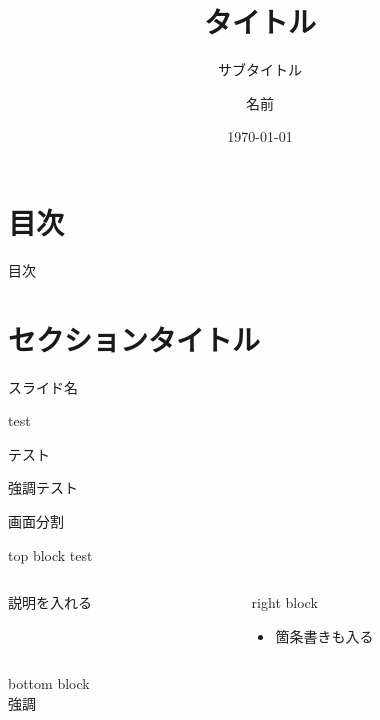 \documentclass[12pt,xcolor=dvipsnames,table,dvipdfmx, aspectratio=169]{beamer} %
\title{タイトル}
\subtitle{サブタイトル}
\author[name]{名前}
\institute[workplace]{所属}
\date{\today}
\theoremstyle{definition}
\begin{document}
	\begin{frame}[plain] %
		\titlepage
	\end{frame}


 	\section*{目次} %
 	\begin{frame}{目次}
 	\tableofcontents
	 \end{frame}

\section{セクションタイトル}

\begin{frame}{\insertsection}{スライド名}
	\begin{block}{test}
	\end{block}
	
	\begin{exampleblock}{テスト}
	\end{exampleblock}
	
	\begin{alertblock}{強調テスト}
	\end{alertblock}
\end{frame}

\begin{frame}{画面分割}
  \begin{block}{top block}
  test
  \end{block}
  \begin{columns}[c]  %
    \begin{column}{0.5\textwidth} %
    説明を入れる
    \end{column}
    \begin{column}{0.5\textwidth} %
      \begin{block}{right block}
        \begin{itemize}
          \item 箇条書きも入る
        \end{itemize}
      \end{block}
    \end{column}
  \end{columns}
  \begin{block}{bottom block}
   \\
  \alert{強調}
  \end{block}
  \end{frame}
\end{document}
